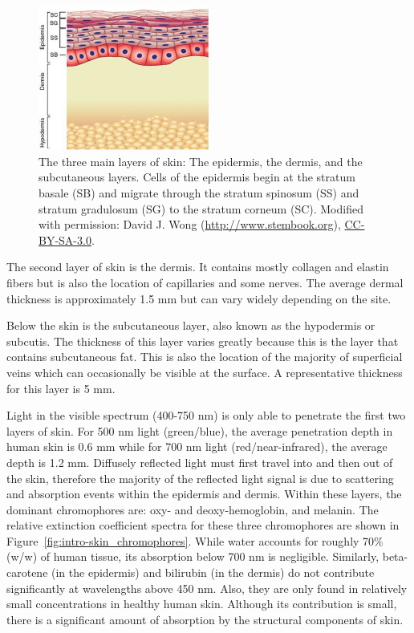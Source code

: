 \begin{figure}
	\centering \includegraphics[width=0.5\textwidth]{figures/intro-skin_layers.jpg}
	\caption[Cross-section of layers of human skin]{\label{fig:intro-skin_layers}The three main layers of skin: The epidermis, the dermis, and the subcutaneous layers. Cells of the epidermis begin at the stratum basale (SB) and migrate through the stratum spinosum (SS) and stratum gradulosum (SG) to the stratum corneum (SC). Modified with permission: \textcopyright David J. Wong (\url{http://www.stembook.org}), \href{http://creativecommons.org/licenses/by-sa/3.0/}{CC-BY-SA-3.0}.\cite{Wong2009}}
\end{figure}

The second layer of skin is the dermis. It contains mostly collagen and elastin fibers but is also the location of capillaries and some nerves. The average dermal thickness is approximately 1.5 mm but can vary widely depending on the site.

Below the skin is the subcutaneous layer, also known as the hypodermis or subcutis. The thickness of this layer varies greatly because this is the layer that contains subcutaneous fat. This is also the location of the majority of superficial veins which can occasionally be visible at the surface. A representative thickness for this layer is 5 mm.

Light in the visible spectrum (400-750 nm) is only able to penetrate the first two layers of skin.\cite{Kochevar2012a} For 500 nm light (green/blue), the average penetration depth in human skin is 0.6 mm while for 700 nm light (red/near-infrared), the average depth is 1.2 mm.\cite{Richards-Kortum1996} Diffusely reflected light must first travel into and then out of the skin, therefore the majority of the reflected light signal is due to scattering and absorption events within the epidermis and dermis. Within these layers, the dominant chromophores are: oxy- and deoxy-hemoglobin, and melanin. The relative extinction coefficient spectra for these three chromophores are shown in Figure~\ref{fig:intro-skin_chromophores}. While water accounts for roughly 70\% (w/w) of human tissue,\cite{Nakagawa2010} its absorption below 700 nm is negligible. Similarly, beta-carotene (in the epidermis) and bilirubin (in the dermis) do not contribute significantly at wavelengths above 450 nm. Also, they are only found in relatively small concentrations in healthy human skin. Although its contribution is small, there is a significant amount of absorption by the structural components of skin.\cite{Bargo2005}

